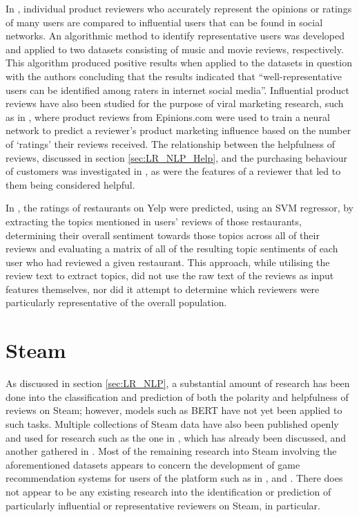 In \cite{choi2013representative}, individual product reviewers who accurately represent the opinions or ratings of many users are compared to influential users that can be found in social networks. An algorithmic method to identify representative users was developed and applied to two datasets consisting of music and movie reviews, respectively. This algorithm produced positive results when applied to the datasets in question with the authors concluding that the results indicated that ``well-representative users can be identified among raters in internet social media''. Influential product reviews have also been studied for the purpose of viral marketing research, such as in \cite{li2009discovering}, where product reviews from Epinions.com were used to train a neural network to predict a reviewer's product marketing influence based on the number of `ratings' their reviews received. The relationship between the helpfulness of reviews, discussed in section \ref{sec:LR_NLP_Help}, and the purchasing behaviour of customers was investigated in \cite{malik2020exploring}, as were the features of a reviewer that led to them being considered helpful.

In \cite{kamath2016understanding}, the ratings of restaurants on Yelp were predicted, using an SVM regressor, by extracting the topics mentioned in users' reviews of those restaurants, determining their overall sentiment towards those topics across all of their reviews and evaluating a matrix of all of the resulting topic sentiments of each user who had reviewed a given restaurant. This approach, while utilising the review text to extract topics, did not use the raw text of the reviews as input features themselves, nor did it attempt to determine which reviewers were particularly representative of the overall population.

\section{Steam} \label{sec:LR_Steam}

As discussed in section \ref{sec:LR_NLP}, a substantial amount of research has been done into the classification and prediction of both the polarity and helpfulness of reviews on Steam; however, models such as BERT have not yet been applied to such tasks. Multiple collections of Steam data have also been published openly and used for research such as the one in \cite{zuo2018sentiment}, which has already been discussed, and another gathered in \cite{o2016condensing}. Most of the remaining research into Steam involving the aforementioned datasets appears to concern the development of game recommendation systems for users of the platform such as in \cite{saaidin2020recommender}, \cite{wang2020using} and \cite{linsteam}. There does not appear to be any existing research into the identification or prediction of particularly influential or representative reviewers on Steam, in particular.
